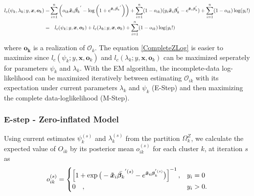 \documentclass[11pt,letterpaper]{article}
\numberwithin{equation}{section}
\numberwithin{equation}{section}
\numberwithin{equation}{section}
\begin{document}
\begin{align}
l_c(\psi_k,\lambda_k;y,\bm{x},\bm{o}_k ) = & \sum_{i=1}^n \left( o_{ik}\bm{\tilde{x}}_i \bar{\bm{\beta}_k }^{'} - \log\left(1+ e^{ \bm{\tilde{x}}_i \bar{\bm{\beta}_k }^{'}}\right) \right) + \sum_{i=1}^n (1-o_{ik}) (y_i \bm{\tilde{x}}_i \bm{\beta}_k^{'}  - e^{\bm{\tilde{x}}_i \bm{\beta}_k^{'}}) + \sum_{i=1}^n (1-o_{ik})\log(y_i!) \nonumber \\
=  & \quad l_c(\psi_k;y,\bm{x},\bm{o}_k) + l_c(\lambda_k; y,\bm{x},\bm{o}_k) + \sum_{i=1}^n (1- o_{ik})\log(y_i!) \label{CompleteZLog}
\end{align}

where $\bm{o_{k}}$ is a realization of $ \mathcal{O}_{k} $. The equation \eqref{CompleteZLog} is easier to maximize since $l_c(\psi_k; y,\bm{x},\bm{o}_k) $ and $l_c(\lambda_k; y,\bm{x},\bm{o}_k) $ can be maximized seperately for parameters $\psi_k$ and $\lambda_k$. With the EM algorithm, the incomplete-data log-likelihood can be maximized iteratively between estimating $\mathcal{O}_{ik}$ with its expectation under current parameters $\lambda_k$ and $\psi_k$ (E-Step) and then maximizing the complete data-loglikelihood (M-Step).

\subsubsection{E-step -  Zero-inflated Model}%

Using current estimates $\psi_k^{(s)}$ and $ \lambda_k^{(s)} $ from the partition $ \Omega^Z_{k}$, we calculate the expected value of ${O_{ik}}$ by its posterior mean ${o_{ik}^{(s)}}$ for each cluster $k$, at iteration $s$ as
\begin{align*}
o_{ik}^{(s)} = \begin{cases}  \left[ 1 + \exp{\big(-\bm{\tilde{x}}_i \bar{\bm{\beta}_k}^{'(s)} - e^ {\bm{\bm{\tilde{x}}_i} \bm{\beta}_k^{'(s)}} \big) } \right]^{-1}, &  y_{i} = 0 \\
  0 \quad , & y_{i}> 0 .
\end{cases}
\end{align*}
\end{document}
